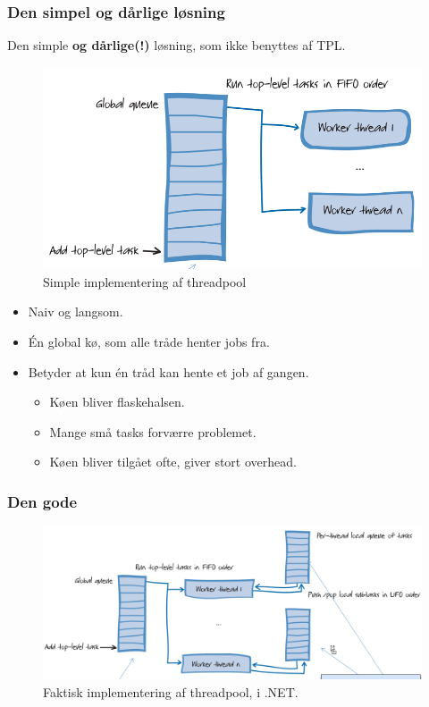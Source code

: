 \subsubsection{Den simpel og dårlige løsning}
Den simple \textbf{og dårlige(!)} løsning, som ikke benyttes af TPL. 

\begin{figure}[h]
	\centering
	\includegraphics[width=0.7\linewidth]{figs/badthreadpool}
	\caption{Simple implementering af threadpool}
	\label{fig:badthreadpool}
\end{figure}


\begin{itemize}
	\item Naiv og langsom.
	\item Én global kø, som alle tråde henter jobs fra.
	\item Betyder at kun én tråd kan hente et job af gangen.
	\begin{itemize}
		\item Køen bliver flaskehalsen.
		\item Mange små tasks forværre problemet.
		\item Køen bliver tilgået ofte, giver stort overhead.
	\end{itemize}
\end{itemize}

\subsubsection{Den gode}

\begin{figure}[h]
	\centering
	\includegraphics[width=\linewidth]{figs/goodthreadpool}
	\caption{Faktisk implementering af threadpool, i .NET.}
	\label{fig:goodthreadpool}
\end{figure}


